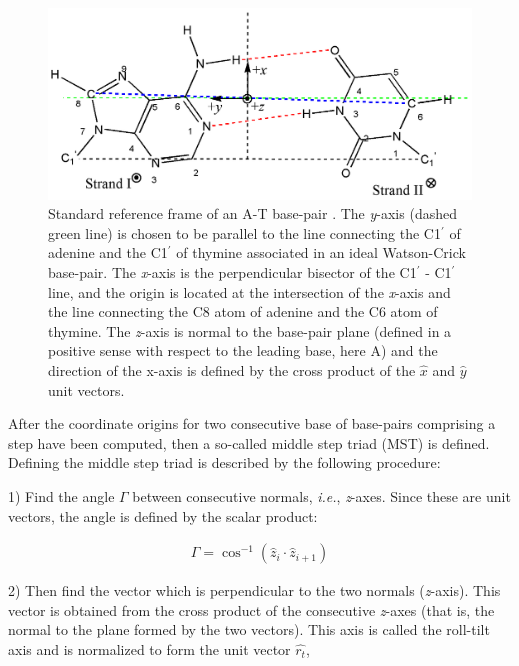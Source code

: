 \begin{figure}[htbp]
\centering
\includegraphics[scale=0.8]{Chapter1/standard.png}
\caption{Standard    reference    frame    of   an    A-T    base-pair
  \cite{olson2001}.  The \textit{y}-axis (dashed green line) is chosen
  to be  parallel to the line  connecting the C1$^{'}$  of adenine and
  the  C1$^{'}$  of  thymine   associated  in  an  ideal  Watson-Crick
  base-pair. The \textit{x}-axis is  the perpendicular bisector of the
  C1$^{'}$  -  C1$^{'}$  line,  and  the  origin  is  located  at  the
  intersection of  the \textit{x}-axis and the line  connecting the C8
  atom of adenine  and the C6 atom of  thymine. The \textit{z}-axis is
  normal  to the  base-pair plane  (defined in  a positive  sense with
  respect to the leading base, here A) and the direction of the x-axis
  is defined by the cross  product of the $\hat{x}$ and $\hat{y}$ unit
  vectors.}
\label{fig:standard}
\end{figure}

After the  coordinate origins for  two consecutive base  of base-pairs
comprising a  step have  been computed, then  a so-called  middle step
triad (MST)  \cite{lu1997} is defined. Defining the  middle step triad
is described by the following procedure:

1) Find the angle $\Gamma$ between consecutive normals, \textit{i.e.},
\textit{z}-axes. Since these are unit vectors, the angle is defined by
the scalar product:

\begin{gather}
\Gamma = \cos^{-1} (\hat{z}_i \cdot \hat{z}_{i+1})
\end{gather}

2)  Then find the  vector which  is perpendicular  to the  two normals
(\textit{z}-axis). This  vector is obtained from the  cross product of
the  consecutive \textit{z}-axes  (that is,  the normal  to  the plane
formed by the two vectors). This axis is called the roll-tilt axis and
is normalized to form the unit vector $\hat{r_t}$,

